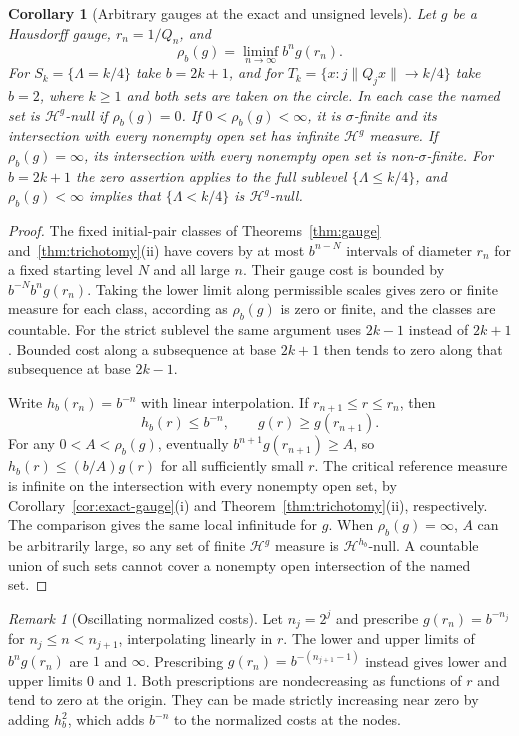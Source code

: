 \documentclass[11pt]{article}
\newtheorem{corollary}[theorem]{Corollary}
\theoremstyle{definition}
\theoremstyle{remark}
\newtheorem{remark}[theorem]{Remark}
\newcommand{\Lam}{\Lambda}
\begin{document}
\begin{corollary}[Arbitrary gauges at the exact and unsigned levels]\label{cor:liminf-gauges}
Let $g$ be a Hausdorff gauge, $r_n=1/Q_n$, and
\[
\rho_b(g)=\liminf_{n\to\infty} b^n g(r_n).
\]
For $S_k=\{\Lam=k/4\}$ take $b=2k+1$, and for
$T_k=\{x:j\|Q_jx\|\to k/4\}$ take $b=2$, where $k\ge1$ and both sets
are taken on the circle. In each case the named set is
$\mathcal H^g$-null if $\rho_b(g)=0$. If $0<\rho_b(g)<\infty$, it is
$\sigma$-finite and its intersection with every nonempty open set has
infinite $\mathcal H^g$ measure. If $\rho_b(g)=\infty$, its intersection
with every nonempty open set is non-$\sigma$-finite. For $b=2k+1$ the
zero assertion applies to the full sublevel $\{\Lam\le k/4\}$, and
$\rho_b(g)<\infty$ implies that $\{\Lam<k/4\}$ is $\mathcal H^g$-null.
\end{corollary}

\begin{proof}
The fixed initial-pair classes of Theorems~\ref{thm:gauge}
and~\ref{thm:trichotomy}(ii) have covers by at most $b^{n-N}$ intervals
of diameter $r_n$ for a fixed starting level $N$ and all large $n$.
Their gauge cost is bounded by $b^{-N}b^n g(r_n)$. Taking the lower
limit along permissible scales gives zero or finite measure for each
class, according as $\rho_b(g)$ is zero or finite, and the classes are
countable. For the strict sublevel the same argument uses $2k-1$
instead of $2k+1$. Bounded cost along a subsequence at base $2k+1$
then tends to zero along that subsequence at base $2k-1$.

Write $h_b(r_n)=b^{-n}$ with linear interpolation. If
$r_{n+1}\le r\le r_n$, then
\[
 h_b(r)\le b^{-n},\qquad g(r)\ge g(r_{n+1}).
\]
For any $0<A<\rho_b(g)$, eventually $b^{n+1}g(r_{n+1})\ge A$,
so $h_b(r)\le(b/A)g(r)$ for all sufficiently small $r$. The critical
reference measure is infinite on the intersection with every nonempty
open set, by Corollary~\ref{cor:exact-gauge}(i) and
Theorem~\ref{thm:trichotomy}(ii), respectively. The comparison gives the
same local infinitude for $g$. When $\rho_b(g)=\infty$, $A$ can be
arbitrarily large, so any set of finite $\mathcal H^g$ measure is
$\mathcal H^{h_b}$-null. A countable union of such sets cannot cover
a nonempty open intersection of the named set.
\end{proof}

\begin{remark}[Oscillating normalized costs]
Let $n_j=2^j$ and prescribe $g(r_n)=b^{-n_j}$ for
$n_j\le n<n_{j+1}$, interpolating linearly in $r$. The lower and upper
limits of $b^ng(r_n)$ are $1$ and $\infty$. Prescribing
$g(r_n)=b^{-(n_{j+1}-1)}$ instead gives lower and upper limits $0$ and $1$.
Both prescriptions are nondecreasing as functions of $r$ and tend to zero
at the origin. They can be made strictly increasing near zero by adding
$h_b^2$, which adds $b^{-n}$ to the normalized costs at the nodes.
\end{remark}
\end{document}
